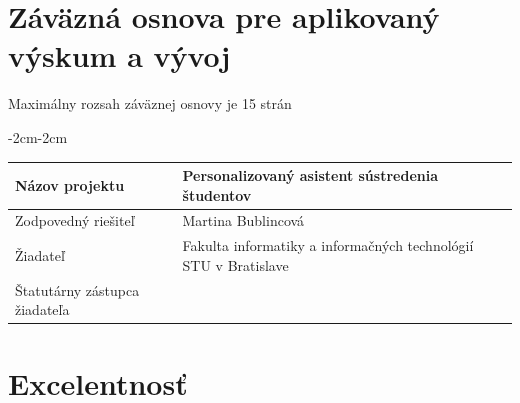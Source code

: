 \documentclass[10pt,slovak,a4paper]{article}
\begin{document}
\section*{Záväzná osnova pre aplikovaný výskum a vývoj}
Maximálny rozsah záväznej osnovy je 15 strán

\begin{table}[H]
\centering
\begin{adjustwidth}{-2cm}{-2cm}
\begin{tabularx}{\linewidth}{|l|X|}
\hline
Názov projektu & Personalizovaný asistent sústredenia študentov \\ \hline
Zodpovedný riešiteľ & Martina Bublincová  \\ \hline
Žiadateľ & Fakulta informatiky a informačných technológií STU v Bratislave  \\ \hline
Štatutárny zástupca žiadateľa &   \\ \hline

\end{tabularx}
\end{adjustwidth}
\end{table}

\section{Excelentnosť}
\end{document}
